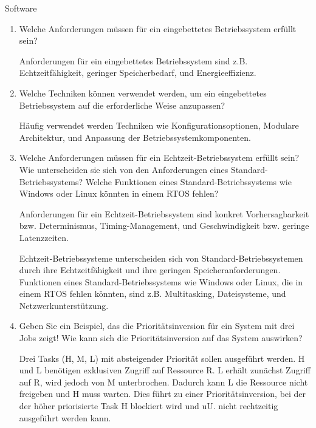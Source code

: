 \documentclass{article}
\begin{document}
\begin{exercise}{Software}
  \begin{enumerate}
    \item Welche Anforderungen müssen für ein eingebettetes Betriebssystem erfüllt sein?

          \begin{solution}
            Anforderungen für ein eingebettetes Betriebssystem sind z.B. Echtzeitfähigkeit, geringer Speicherbedarf, und Energieeffizienz.
          \end{solution}

    \item Welche Techniken können verwendet werden, um ein eingebettetes Betriebssystem auf die erforderliche Weise anzupassen?

          \begin{solution}
            Häufig verwendet werden Techniken wie Konfigurationsoptionen, Modulare Architektur, und Anpassung der Betriebssystemkomponenten.
          \end{solution}

    \item Welche Anforderungen müssen für ein Echtzeit-Betriebssystem erfüllt sein? Wie unterscheiden sie sich von den Anforderungen eines Standard-Betriebssystems? Welche Funktionen eines Standard-Betriebssystems wie Windows oder Linux könnten in einem RTOS fehlen?

          \begin{solution}
            Anforderungen für ein Echtzeit-Betriebssystem sind konkret Vorhersagbarkeit bzw. Determinismus, Timing-Management, und Geschwindigkeit bzw. geringe Latenzzeiten.

            Echtzeit-Betriebssysteme unterscheiden sich von Standard-Betriebssystemen durch ihre Echtzeitfähigkeit und ihre geringen Speicheranforderungen. Funktionen eines Standard-Betriebssystems wie Windows oder Linux, die in einem RTOS fehlen könnten, sind z.B. Multitasking, Dateisysteme, und Netzwerkunterstützung.
          \end{solution}

    \item Geben Sie ein Beispiel, das die Prioritätsinversion für ein System mit drei Jobs zeigt! Wie kann sich die Prioritätsinversion auf das System auswirken?

          \begin{solution}
            Drei Tasks (H, M, L) mit absteigender Priorität sollen ausgeführt werden. H und L benötigen exklusiven Zugriff auf Ressource R. L erhält zunächst Zugriff auf R, wird jedoch von M unterbrochen. Dadurch kann L die Ressource nicht freigeben und H muss warten. Dies führt zu einer Prioritätsinversion, bei der der höher priorisierte Task H blockiert wird und  uU. nicht rechtzeitig ausgeführt werden kann.
          \end{solution}


\end{enumerate}
\end{exercise}
\end{document}
